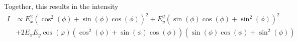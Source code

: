 Together, this results in the intensity
\begin{align}
  I &\propto E_x^2 \left(\cos^2(\phi) + \sin(\phi)\cos(\phi)\right)^2 + E_y^2 \left(\sin(\phi)\cos(\phi) + \sin^2(\phi)\right)^2 \\
    &+ 2 E_x E_y \cos(\varphi) \left(\cos^2(\phi) + \sin(\phi)\cos(\phi)\right)\left(\sin(\phi)\cos(\phi) + \sin^2(\phi)\right)
\end{align}


